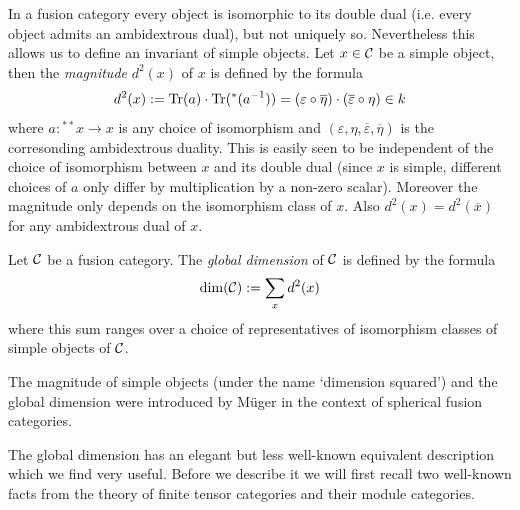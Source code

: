 \documentclass{amsart}
\begin{document}
In a fusion category every object is isomorphic to its double dual (i.e. every object admits an ambidextrous dual), but not uniquely so. Nevertheless this allows us to define an invariant of simple objects. Let $x \in \mathcal C$ be a simple object, then the {\em magnitude}
$d^2(x)$ of $x$ is defined by the formula 
\begin{equation*}
	d^2(x) := \mathrm{Tr}(a) \cdot \mathrm{Tr}({}^*(a^{-1})) = (\varepsilon \circ \overline{\eta}) \cdot (\overline{\varepsilon} \circ \eta) \in k
\end{equation*}
where $a: {}^{**}x \to x$ is any choice of isomorphism and $(\varepsilon, \eta, \overline{\varepsilon}, \overline{\eta})$ is the corresonding ambidextrous duality.
This is easily seen to be independent of the choice of isomorphism between $x$ and its double dual (since $x$ is simple, different choices of $a$ only differ by multiplication by a non-zero scalar). Moreover the magnitude only depends on the isomorphism class of $x$. Also $d^2(x) = d^2(\overline{x})$ for any ambidextrous 
dual of $x$. 
\begin{definition}
	Let $\mathcal C$ be a fusion category. The {\em global dimension} of $\mathcal C$ is defined by the formula
	\begin{equation*}
		\dim(\mathcal C) := \sum_{x} d^2(x)
	\end{equation*}
	where this sum ranges over a choice of representatives of isomorphism classes of simple objects of $\mathcal C$. 
\end{definition}
\noindent The magnitude of simple objects (under the name `dimension squared') and the global dimension were introduced by M\"uger \cite{MR1966524} in the context of spherical fusion categories.


The global dimension has an elegant but less well-known equivalent description which we find very useful. Before we describe it we will first recall two well-known facts from the theory of finite tensor categories and their module categories.
 
\end{document}
